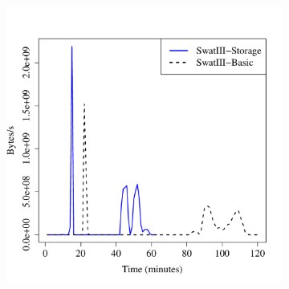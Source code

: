 \documentclass[conference]{IEEEtran}
\begin{document}
\begin{figure}[htb]
        \centering
        \begin{subfigure}[b]{0.3\textwidth}
                \includegraphics[width=\textwidth]{Figure/SystemData/Plots/BGHddSsdHdfsWrIops.pdf}

\end{subfigure}
\end{figure}
\end{document}

